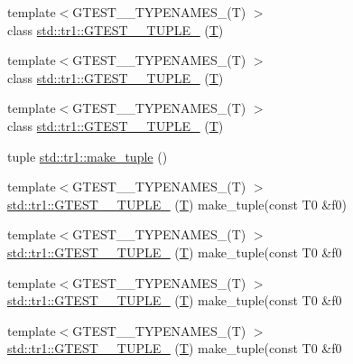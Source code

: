 \begin{DoxyCompactItemize}
{\footnotesize template$<$G\+T\+E\+S\+T\+\_\+\_\+\+T\+Y\+P\+E\+N\+A\+M\+E\+S\+\_\+(\+T) $>$ }\\class \hyperlink{namespacestd_1_1tr1_ab451b390a95ee0555d7a43b67ea348aa}{std\+::tr1\+::\+G\+T\+E\+S\+T\+\_\+\_\+\+T\+U\+P\+L\+E\+\_\+} (\hyperlink{functions__7_8js_adf1f3edb9115acb0a1e04209b7a9937b}{T})
\item 
{\footnotesize template$<$G\+T\+E\+S\+T\+\_\+\_\+\+T\+Y\+P\+E\+N\+A\+M\+E\+S\+\_\+(\+T) $>$ }\\class \hyperlink{namespacestd_1_1tr1_ab2b1c72e9db7436909d9ac011645f29d}{std\+::tr1\+::\+G\+T\+E\+S\+T\+\_\+\_\+\+T\+U\+P\+L\+E\+\_\+} (\hyperlink{functions__7_8js_adf1f3edb9115acb0a1e04209b7a9937b}{T})
\item 
{\footnotesize template$<$G\+T\+E\+S\+T\+\_\+\_\+\+T\+Y\+P\+E\+N\+A\+M\+E\+S\+\_\+(\+T) $>$ }\\class \hyperlink{namespacestd_1_1tr1_ab4f2c7d5458171bec6c4330fc5c7aba6}{std\+::tr1\+::\+G\+T\+E\+S\+T\+\_\+\_\+\+T\+U\+P\+L\+E\+\_\+} (\hyperlink{functions__7_8js_adf1f3edb9115acb0a1e04209b7a9937b}{T})
\item 
tuple \hyperlink{namespacestd_1_1tr1_af7e12a0f5b5791b5b7c49a5a17b85359}{std\+::tr1\+::make\+\_\+tuple} ()
\item 
{\footnotesize template$<$G\+T\+E\+S\+T\+\_\+\_\+\+T\+Y\+P\+E\+N\+A\+M\+E\+S\+\_\+(\+T) $>$ }\\\hyperlink{namespacestd_1_1tr1_a8b196fb65b7521a688f59c51418ab191}{std\+::tr1\+::\+G\+T\+E\+S\+T\+\_\+\_\+\+T\+U\+P\+L\+E\+\_\+} (\hyperlink{functions__7_8js_adf1f3edb9115acb0a1e04209b7a9937b}{T}) make\+\_\+tuple(const T0 \&f0)
\item 
{\footnotesize template$<$G\+T\+E\+S\+T\+\_\+\_\+\+T\+Y\+P\+E\+N\+A\+M\+E\+S\+\_\+(\+T) $>$ }\\\hyperlink{namespacestd_1_1tr1_a90d9f0e7f95fa1c2093372d72493c3c1}{std\+::tr1\+::\+G\+T\+E\+S\+T\+\_\+\_\+\+T\+U\+P\+L\+E\+\_\+} (\hyperlink{functions__7_8js_adf1f3edb9115acb0a1e04209b7a9937b}{T}) make\+\_\+tuple(const T0 \&f0
\item 
{\footnotesize template$<$G\+T\+E\+S\+T\+\_\+\_\+\+T\+Y\+P\+E\+N\+A\+M\+E\+S\+\_\+(\+T) $>$ }\\\hyperlink{namespacestd_1_1tr1_a4493d91e61718415264f7e72fea42930}{std\+::tr1\+::\+G\+T\+E\+S\+T\+\_\+\_\+\+T\+U\+P\+L\+E\+\_\+} (\hyperlink{functions__7_8js_adf1f3edb9115acb0a1e04209b7a9937b}{T}) make\+\_\+tuple(const T0 \&f0
\item 
{\footnotesize template$<$G\+T\+E\+S\+T\+\_\+\_\+\+T\+Y\+P\+E\+N\+A\+M\+E\+S\+\_\+(\+T) $>$ }\\\hyperlink{namespacestd_1_1tr1_a4e57e6fab4219802275bd31821b31b58}{std\+::tr1\+::\+G\+T\+E\+S\+T\+\_\+\_\+\+T\+U\+P\+L\+E\+\_\+} (\hyperlink{functions__7_8js_adf1f3edb9115acb0a1e04209b7a9937b}{T}) make\+\_\+tuple(const T0 \&f0

\end{DoxyCompactItemize}
